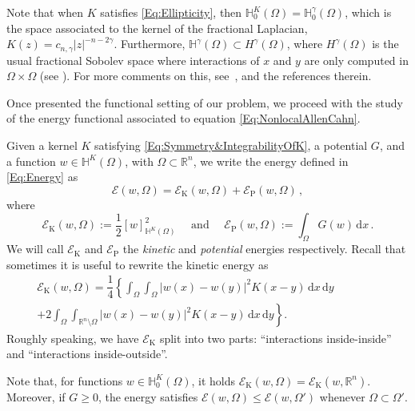 \documentclass[12pt,reqno]{amsart}
\theoremstyle{definition}
\theoremstyle{remark}
\newcommand{\con}[1]{\mathbb{#1}}
\newcommand{\R}{\con{R}} %
\renewcommand{\H}{\con{H}}
\newcommand{\ecal}{\mathcal{E}}
\newcommand{\s}{\gamma}
\renewcommand{\d}{\,\mathrm{d}} %
\numberwithin{equation}{section}
\begin{document}
Note that when $K$ satisfies \eqref{Eq:Ellipticity}, then $\H^K_0 (\Omega) = \H^\s_0 (\Omega)$,
which is the space associated to the kernel of the fractional Laplacian, $K(z) = c_{n,\s} |z|^{-n-2\s}$.
Furthermore, $\H^\s(\Omega) \subset H^\s(\Omega)$, where $H^\s(\Omega)$ is the usual fractional Sobolev space where interactions of $x$ and $y$ are only computed in $\Omega \times \Omega$ (see \cite{HitchhikerGuide}).  For more comments on this, see~\cite{CozziPassalacqua}, and the references therein.

Once presented the functional setting of our problem, we proceed with the study of the energy functional associated to equation \eqref{Eq:NonlocalAllenCahn}. 


Given a kernel $K$ satisfying \eqref{Eq:Symmetry&IntegrabilityOfK}, a potential $G$, and a function $w\in \H^K(\Omega)$, with $\Omega\subset \R^{n}$, we write the energy defined in \eqref{Eq:Energy} as
$$
\ecal(w, \Omega) = \ecal_\mathrm{K}(w,\Omega) + \ecal_\mathrm{P}(w,\Omega)\,,
$$
where
$$
\ecal_\mathrm{K}(w, \Omega) := \dfrac{1}{2} [w]^2_{\H^K(\Omega)} \quad \text{ and } \quad  \ecal_\mathrm{P}(w, \Omega) := \int_{\Omega} G(w) \d x
\,.
$$
We will call $\ecal_\mathrm{K}$ and $\ecal_\mathrm{P}$ the \emph{kinetic} and \emph{potential} energies respectively. Recall that sometimes it is useful to rewrite the kinetic energy as
\begin{equation}
\label{Eq:KineticEnergyInteractions}
\begin{split}
\ecal_\mathrm{K}(w, \Omega) = \dfrac{1}{4} \left \{ \int_\Omega \int_\Omega |w(x) - w(y)|^2 K(x-y) \d x \d y \right. \qquad \qquad \\
+\left. 2 \int_\Omega \int_{\R^n \setminus \Omega} |w(x) - w(y)|^2 K(x-y) \d x \d y \right \}.
\end{split}	
\end{equation}
Roughly speaking, we have $\ecal_\mathrm{K}$ split into two parts: ``interactions inside-inside'' and ``interactions inside-outside''.

Note that, for functions $w\in \H^K_0(\Omega)$, it holds $\ecal_\mathrm{K}(w,\Omega) = \ecal_\mathrm{K}(w,\R^n)$. Moreover, if $G\geq 0$, the energy satisfies $\ecal(w, \Omega) \leq \ecal(w, \Omega')$  whenever $ \Omega \subset \Omega'$.
\end{document}
